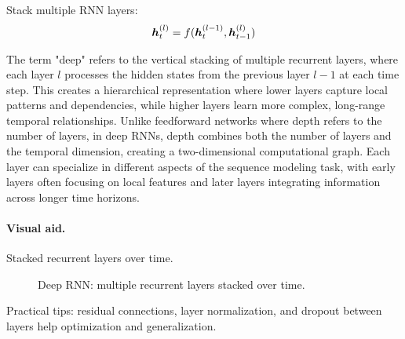 Stack multiple RNN layers:
\begin{equation}
\boldsymbol{h}_t^{(l)} = f(\boldsymbol{h}_t^{(l-1)}, \boldsymbol{h}_{t-1}^{(l)})
\end{equation}

The term "deep" refers to the vertical stacking of multiple recurrent layers, where each layer $l$ processes the hidden states from the previous layer $l-1$ at each time step. This creates a hierarchical representation where lower layers capture local patterns and dependencies, while higher layers learn more complex, long-range temporal relationships. Unlike feedforward networks where depth refers to the number of layers, in deep RNNs, depth combines both the number of layers and the temporal dimension, creating a two-dimensional computational graph. Each layer can specialize in different aspects of the sequence modeling task, with early layers often focusing on local features and later layers integrating information across longer time horizons.

\paragraph{Visual aid.} Stacked recurrent layers over time.
\begin{figure}[h]
    \centering
    \caption{Deep RNN: multiple recurrent layers stacked over time.}
\end{figure}

Practical tips: residual connections, layer normalization, and dropout between layers help optimization and generalization.

